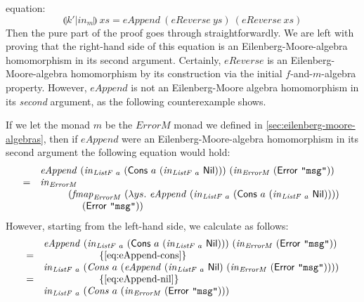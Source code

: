 \documentclass{jfp1}
\newcommand{\eFold}[2]{\llparenthesis #1|#2 \rrparenthesis}
\newcommand{\eqAnnotation}[1]{\hspace{2cm}\left\{\textrm{#1}\right\}}
\begin{document}
equation:
\begin{equation}\label{eq:ereverse-eappend}
  \eFold{k'}{\mathit{in}_m}~\mathit{xs} = \mathit{eAppend}~(\mathit{eReverse}~\mathit{ys})~(\mathit{eReverse}~\mathit{xs})
\end{equation}
Then the pure part of the proof goes through straightforwardly. We are
left with proving that the right-hand side of this equation is an
Eilenberg-Moore-algebra homomorphism in its second
argument. Certainly, $\mathit{eReverse}$ is an Eilenberg-Moore-algebra
homomorphism by its construction via the initial $f$-and-$m$-algebra
property. However, $\mathit{eAppend}$ is not an Eilenberg-Moore
algebra homomorphism in its \emph{second} argument, as the following
counterexample shows.

If we let the monad $m$ be the $\mathit{ErrorM}$ monad we defined in
\autoref{sec:eilenberg-moore-algebras}, then if $\mathit{eAppend}$
were an Eilenberg-Moore-algebra homomorphism in its second argument
the following equation would hold:
\begin{equation}\label{eq:purported-em}
  \begin{array}{cl}
    &\mathit{eAppend}~(\mathit{in}_{\mathit{ListF}~a}~(\mathsf{Cons}~a~(\mathit{in}_{\mathit{ListF}~a}~\mathsf{Nil})))~(\mathit{in}_{\mathit{ErrorM}}~(\mathsf{Error}~\texttt{"msg"}))
    \\ =&\mathit{in}_{\mathit{ErrorM}}~\\ & \hspace{1cm}(\mathit{fmap}_{\mathit{ErrorM}}~(\lambda
    ys.~\mathit{eAppend}~(\mathit{in}_{\mathit{ListF}~a}~(\mathsf{Cons}~a~(\mathit{in}_{\mathit{ListF}~a}~\mathsf{Nil}))))~\\ & \hspace{1.5cm}(\mathsf{Error}~\texttt{"msg"}))
  \end{array}
\end{equation}
However, starting from the left-hand side, we calculate as follows:
\begin{displaymath}
  \begin{array}{cl}
    & \mathit{eAppend}~(\mathit{in}_{\mathit{ListF}~a}~(\mathsf{Cons}~a~(\mathit{in}_{\mathit{ListF}~a}~\mathsf{Nil})))~(\mathit{in}_{\mathit{ErrorM}}~(\mathsf{Error}~\texttt{"msg"})) \\
    =&\eqAnnotation{\autoref{eq:eAppend-cons}} \\
    & \mathit{in}_{\mathit{ListF}~a}~(\mathit{Cons}~a~(\mathit{eAppend}~(\mathit{in}_{\mathit{ListF}~a}~\mathsf{Nil})~(\mathit{in}_{\mathit{ErrorM}}~(\mathsf{Error}~\texttt{"msg"})))) \\
    =&\eqAnnotation{\autoref{eq:eAppend-nil}} \\
    & \mathit{in}_{\mathit{ListF}~a}~(\mathit{Cons}~a~(\mathit{in}_{\mathit{ErrorM}}~(\mathsf{Error}~\texttt{"msg"})))
  \end{array}
\end{displaymath}
\end{document}

